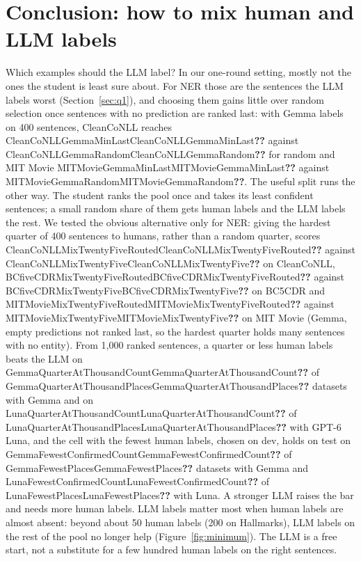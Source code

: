 \documentclass[11pt]{article}
\newcommand{\res}[1]{\ifcsname #1\endcsname\csname #1\endcsname\else\textbf{??}\fi}
\begin{document}
\section{Conclusion: how to mix human and LLM labels}

Which examples should the LLM label? In our one-round setting, mostly not the ones the student is least sure about. For NER those are the sentences the LLM labels worst (Section~\ref{sec:q1}), and choosing them gains little over random selection once sentences with no prediction are ranked last: with Gemma labels on 400 sentences, CleanCoNLL reaches \res{CleanCoNLLGemmaMinLast} against \res{CleanCoNLLGemmaRandom} for random and MIT Movie \res{MITMovieGemmaMinLast} against \res{MITMovieGemmaRandom}. The useful split runs the other way. The student ranks the pool once and takes its least confident sentences; a small random share of them gets human labels and the LLM labels the rest. We tested the obvious alternative only for NER: giving the hardest quarter of 400 sentences to humans, rather than a random quarter, scores \res{CleanCoNLLMixTwentyFiveRouted} against \res{CleanCoNLLMixTwentyFive} on CleanCoNLL, \res{BCfiveCDRMixTwentyFiveRouted} against \res{BCfiveCDRMixTwentyFive} on BC5CDR and \res{MITMovieMixTwentyFiveRouted} against \res{MITMovieMixTwentyFive} on MIT Movie (Gemma, empty predictions not ranked last, so the hardest quarter holds many sentences with no entity). From 1{,}000 ranked sentences, a quarter or less human labels beats the LLM on \res{GemmaQuarterAtThousandCount} of \res{GemmaQuarterAtThousandPlaces} datasets with Gemma and on \res{LunaQuarterAtThousandCount} of \res{LunaQuarterAtThousandPlaces} with GPT-6 Luna, and the cell with the fewest human labels, chosen on dev, holds on test on \res{GemmaFewestConfirmedCount} of \res{GemmaFewestPlaces} datasets with Gemma and \res{LunaFewestConfirmedCount} of \res{LunaFewestPlaces} with Luna. A stronger LLM raises the bar and needs more human labels. LLM labels matter most when human labels are almost absent: beyond about 50 human labels (200 on Hallmarks), LLM labels on the rest of the pool no longer help (Figure~\ref{fig:minimum}). The LLM is a free start, not a substitute for a few hundred human labels on the right sentences.
\end{document}
